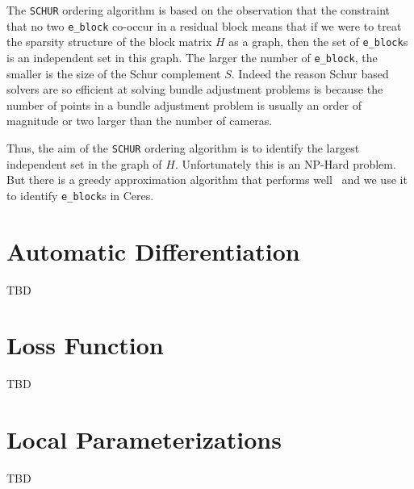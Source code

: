 The \texttt{SCHUR} ordering algorithm is based on the observation that
the constraint that no two \texttt{e\_block} co-occur in a residual
block means that if we were to treat the sparsity structure of the
block matrix $H$ as a graph, then the set of \texttt{e\_block}s is an
independent set in this graph. The larger the number of
\texttt{e\_block}, the smaller is the size of the Schur complement $S$. Indeed the reason Schur based solvers are so efficient at solving bundle adjustment problems is because the number of points in a bundle adjustment problem is usually an order of magnitude or two larger than the number of cameras.

Thus, the aim of the \texttt{SCHUR} ordering algorithm is to identify the largest independent set in the graph of $H$. Unfortunately this is an NP-Hard problem. But there is a  greedy approximation algorithm that performs well~\cite{li2007miqr} and we use it to identify \texttt{e\_block}s in Ceres.

\section{Automatic Differentiation}
TBD
\section{Loss Function}
TBD
\section{Local Parameterizations}
TBD